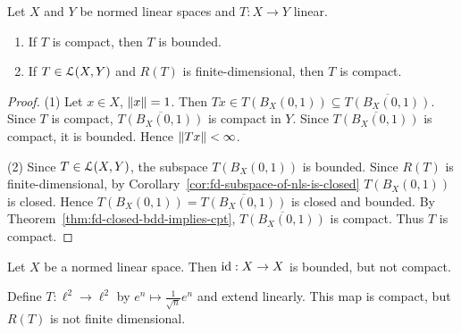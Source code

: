 \begin{proposition}
    Let $X$ and $Y$ be normed linear spaces and $T:X \rightarrow Y$ linear.
    \begin{enumerate}[label = (\arabic*),itemsep=1pt,topsep=3pt]
        \item If $T$ is compact, then $T$ is bounded.
        \item If $T \in \mathcal{L}(X,Y)$ and $R(T)$ is finite-dimensional, then $T$ is compact.
    \end{enumerate}
\end{proposition}
    \begin{proof}
        (1) Let $x \in X$, $\left\lVert x \right\rVert = 1$. Then $Tx \in T(B_X(0,1)) \subseteq \overline{T(B_X(0,1))}$. Since $T$ is compact, $\overline{T(B_X(0,1))}$ is compact in $Y$. Since $\overline{T(B_X(0,1))}$ is compact, it is bounded. Hence $\left\lVert Tx \right\rVert < \infty$.

        (2) Since $T \in \mathcal{L}(X,Y)$, the subspace $T(B_X(0,1))$ is bounded. Since $R(T)$ is finite-dimensional, by Corollary~\ref{cor:fd-subspace-of-nls-is-closed} $T(B_X(0,1))$ is closed. Hence $T(B_X(0,1)) = \overline{T(B_X(0,1))}$ is closed and bounded. By Theorem~\ref{thm:fd-closed-bdd-implies-cpt}, $\overline{T(B_X(0,1))}$ is compact. Thus $T$ is compact.
    \end{proof}

\begin{example}
    Let $X$ be a normed linear space. Then $\operatorname{id}:X \rightarrow X$ is bounded, but not compact. 

    Define $T:\ell^2 \rightarrow \ell^2$ by $e^n \mapsto \frac{1}{\sqrt{n}}e^n$ and extend linearly. This map is compact, but $R(T)$ is not finite dimensional.
\end{example}

